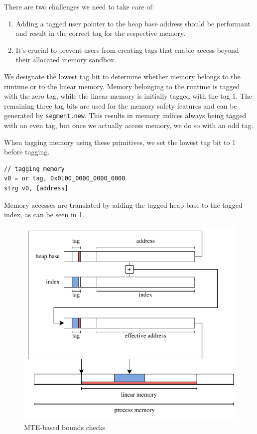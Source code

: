 There are two challenges we need to take care of:
\begin{enumerate}
    \item Adding a tagged user pointer to the heap base address should be performant and result in the correct tag for the respective memory.
    \item It's crucial to prevent users from creating tags that enable access beyond their allocated memory sandbox.
\end{enumerate}

We designate the lowest tag bit to determine whether memory belongs to the runtime or to the linear memory.
Memory belonging to the runtime is tagged with the zero tag, while the linear memory is initially tagged with the tag 1.
The remaining three tag bits are used for the memory safety features and can be generated by \texttt{segment.new}.
This results in memory indices always being tagged with an even tag, but once we actually access memory, we do so with an odd tag.

When tagging memory using these primitives, we set the lowest tag bit to 1 before tagging.

\begin{lstlisting}[frame=h,style=customc,
    label={lst:generated-code-tagging}]
// tagging memory
v0 = or tag, 0x0100_0000_0000_0000
stzg v0, [address]
\end{lstlisting}

Memory accesses are translated by adding the tagged heap base to the tagged index, as can be seen in \cref{fig:system-design-mem-safety-bounds}.

\begin{figure}[t]
    \centering
    \includegraphics[scale=0.75]{figures/build/bounds-mem-safety}
    \caption{MTE-based bounds checks}
    \label{fig:system-design-mem-safety-bounds}
\end{figure}

